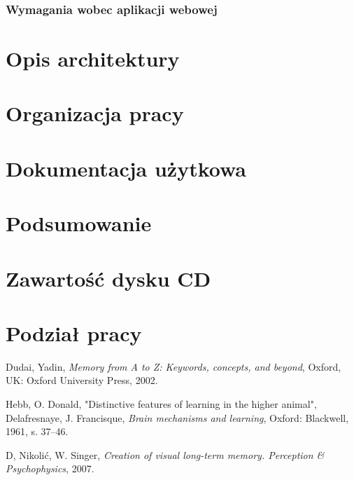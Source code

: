 \documentclass{pracamgr}
\begin{document}
\subsection{Wymagania wobec aplikacji webowej}

\chapter{Opis architektury}\label{r:architecture}

\chapter{Organizacja pracy}\label{r:org}

\chapter{Dokumentacja użytkowa}\label{r:documentation}

\chapter{Podsumowanie}

\appendix

\chapter{Zawartość dysku CD}

\chapter{Podział pracy}

\begin{thebibliography}{99}

 Dudai, Yadin, \textit{Memory from A to Z: Keywords, concepts, and beyond}, Oxford, UK: Oxford University Press, 2002.

 Hebb, O. Donald, "Distinctive features of learning in the higher animal", Delafresnaye, J. Francisque, \textit{Brain mechanisms and learning}, Oxford: Blackwell, 1961, s. 37–46.

 D, Nikolić, W. Singer, \textit{Creation of visual long-term memory. Perception \& Psychophysics}, 2007.


\end{thebibliography}
\end{document}

